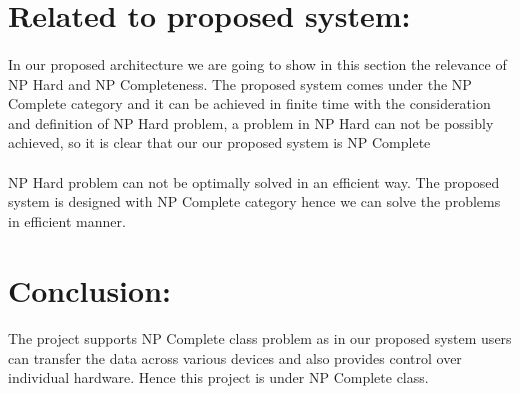 \documentclass[11pt,a4paper]{report}
\begin{document}
\section{Related to proposed system:}
\paragraph{}In our proposed architecture we are going to show in this section the relevance of NP Hard and NP Completeness. The proposed system comes under the NP Complete category and it can be achieved in finite time with the consideration and definition of NP Hard problem, a problem in NP Hard can not be possibly achieved, so it is clear that our our proposed system is NP Complete
\paragraph{}NP Hard problem can not be optimally solved in an efficient way. The proposed system is designed with NP Complete category hence we can solve the problems in efficient manner.\\


\section{Conclusion:}
\paragraph{} The project supports NP Complete class problem as in our proposed system users can transfer the data across various devices and also provides control over individual hardware. Hence this project is under NP Complete class.\\
\end{document}
